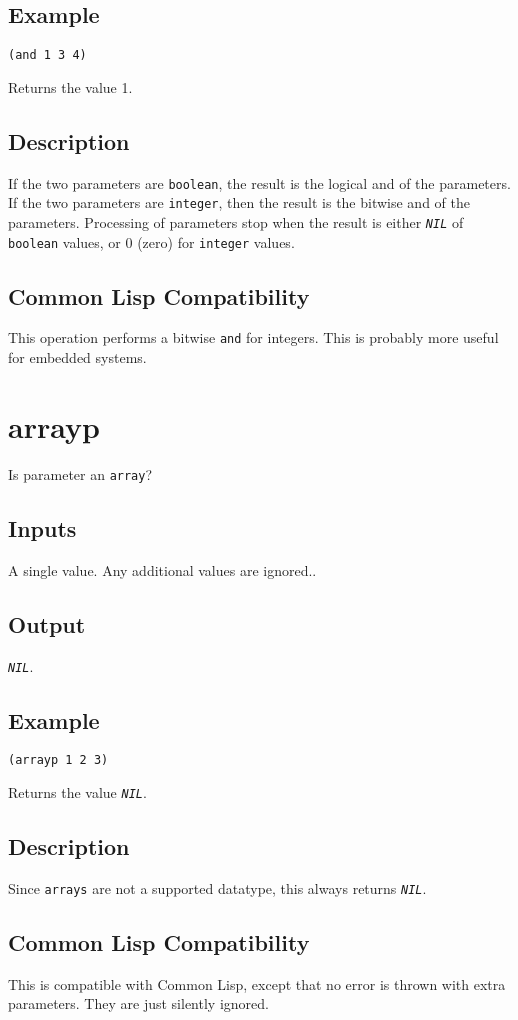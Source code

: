 \documentclass[10pt, openany]{book}
\newcommand{\constant}[1]{\emph{\texttt{#1}}}
\newcommand{\keyword}[1]{\texttt{#1}}
\newcommand{\datatype}[1]{\texttt{#1}}
\newcommand{\cl}{Common Lisp}
\begin{document}
\subsection{Example}
\begin{lstlisting}
(and 1 3 4)
\end{lstlisting}
Returns the value 1.
\subsection{Description}
If the two parameters are \datatype{boolean}, the result is the logical and of the parameters.  If the two parameters are \datatype{integer}, then the result is the bitwise and of the parameters.  Processing of parameters stop when the result is either \constant{NIL} of \datatype{boolean} values, or 0 (zero) for \datatype{integer} values.
\subsection{Common Lisp Compatibility}
This operation performs a bitwise \keyword{and} for integers.  This is probably more useful for embedded systems.

\section{arrayp}
Is parameter an \datatype{array}?
\subsection{Inputs}
A single value.  Any additional values are ignored..
\subsection{Output}
\constant{NIL}.
\subsection{Example}
\begin{lstlisting}
(arrayp 1 2 3)
\end{lstlisting}
Returns the value \constant{NIL}.
\subsection{Description}
Since \datatype{arrays} are not a supported datatype, this always returns \constant{NIL}.
\subsection{Common Lisp Compatibility}
This is compatible with \cl, except that no error is thrown with extra parameters.  They are just silently ignored.
\end{document}

